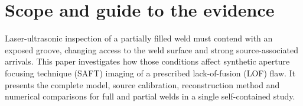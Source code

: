\documentclass[11pt]{article}
\begin{document}
\newcommand{\saftFullContrast}{12.79}
\newcommand{\saftFullPercentile}{21.28}
\newcommand{\saftFullCoverage}{100.0}
\newcommand{\saftFullPeak}{5.18}
\newcommand{\saftFullDistance}{0.033}
\newcommand{\saftPartialContrast}{4.36}
\newcommand{\saftPartialPercentile}{8.74}
\newcommand{\saftPartialCoverage}{95.8}
\newcommand{\saftPartialPeak}{16.57}
\newcommand{\saftPartialDistance}{0.046}
\newcommand{\saftPartialPeakExact}{16.568}
\newcommand{\saftPartialX}{2.80}
\newcommand{\saftPartialZ}{19.95}
\newcommand{\saftPartialDistanceExact}{0.0458}
\newcommand{\saftPartialContrastExact}{4.36}
\newcommand{\saftPartialPristinePeakExact}{6.820}
\newcommand{\saftPartialPristineX}{-6.90}
\newcommand{\saftPartialPristineZ}{23.25}
\newcommand{\saftPartialPristineDistanceExact}{9.8685}
\newcommand{\saftPartialPristineContrastExact}{-6.87}
\newcommand{\saftPartialDifferencePeakExact}{32.743}
\newcommand{\saftPartialDifferenceX}{2.80}
\newcommand{\saftPartialDifferenceZ}{18.05}
\newcommand{\saftPartialDifferenceDistanceExact}{0.4187}
\newcommand{\saftPartialDifferenceContrastExact}{11.09}
\newcommand{\saftPartialFinerContrast}{4.36}
\newcommand{\saftPartialFinerCoverage}{95.8}
\newcommand{\saftPartialWideContrast}{6.43}
\newcommand{\saftPartialWideCoverage}{94.3}
\newcommand{\saftPartialFloorSourceContrast}{8.77}
\newcommand{\saftPartialFloorSourceCoverage}{48.5}
\newcommand{\saftPartialPlateContrast}{4.33}
\newcommand{\saftPartialPlateCoverage}{95.8}
\newcommand{\saftPartialFloorReceiverContrast}{-4.82}
\newcommand{\saftPartialFloorReceiverCoverage}{95.8}
\newcommand{\saftPartialBandOneFiveContrast}{4.20}
\newcommand{\saftPartialBandOneFiveCoverage}{95.8}
\newcommand{\saftPartialShortBandContrast}{4.29}
\newcommand{\saftPartialShortBandCoverage}{95.8}
\newcommand{\saftPartialShortLowContrast}{4.34}
\newcommand{\saftPartialShortLowCoverage}{95.8}
\newcommand{\saftPartialDisplayReference}{40}



\section{Scope and guide to the evidence}
\label{saft:scope}
Laser-ultrasonic inspection of a partially filled weld must contend with an exposed groove, changing access to the weld surface and strong source-associated arrivals. This paper investigates how those conditions affect synthetic aperture focusing technique (SAFT) imaging of a prescribed lack-of-fusion (LOF) flaw. It presents the complete model, source calibration, reconstruction method and numerical comparisons for full and partial welds in a single self-contained study.
\end{document}
